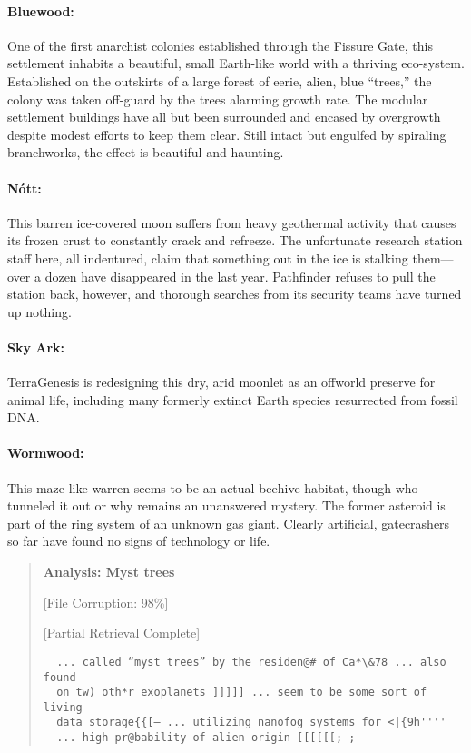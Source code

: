 \paragraph{Bluewood:}
\label{sec:bluewood} One of the first anarchist colonies established
through the Fissure Gate, this settlement inhabits a beautiful, small
Earth-like world with a thriving eco-system. Established on the
outskirts of a large forest of eerie, alien, blue “trees,” the colony
was taken off-guard by the trees alarming growth rate. The modular
settlement buildings have all but been surrounded and encased by
overgrowth despite modest efforts to keep them clear. Still intact but
engulfed by spiraling branchworks, the effect is beautiful and
haunting.

\paragraph{Nótt:}
\label{sec:nott} This barren ice-covered moon suffers from heavy
geothermal activity that causes its frozen crust to constantly crack
and refreeze. The unfortunate research station staff here, all
indentured, claim that something out in the ice is stalking them—over
a dozen have disappeared in the last year. Pathfinder refuses to pull
the station back, however, and thorough searches from its security
teams have turned up nothing.

\paragraph{Sky Ark:}
\label{sec:sky-ark} TerraGenesis is redesigning this dry, arid
moonlet as an offworld preserve for animal life, including many
formerly extinct Earth species resurrected from fossil DNA.

\paragraph{Wormwood:}
\label{sec:wormwood} This maze-like warren seems to be an actual
beehive habitat, though who tunneled it out or why remains an
unanswered mystery. The former asteroid is part of the ring system of
an unknown gas giant. Clearly artificial, gatecrashers so far have
found no signs of technology or life.

\begin{quotation}
  \textbf{Analysis: Myst trees}

  [File Corruption: 98\%]

  [Partial Retrieval Complete]

\begin{verbatim}
  ... called “myst trees” by the residen@# of Ca*\&78 ... also found
  on tw) oth*r exoplanets ]]]]] ... seem to be some sort of living
  data storage{{[— ... utilizing nanofog systems for <|{9h''''
  ... high pr@bability of alien origin [[[[[[; ;
\end{verbatim}
\end{quotation}

